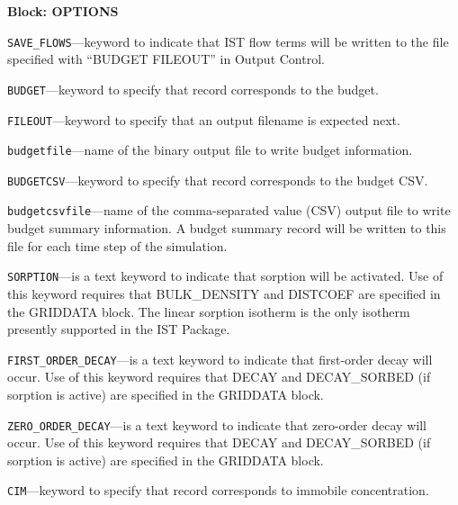 
\item \textbf{Block: OPTIONS}

\begin{description}
\item \texttt{SAVE\_FLOWS}---keyword to indicate that IST flow terms will be written to the file specified with ``BUDGET FILEOUT'' in Output Control.

\item \texttt{BUDGET}---keyword to specify that record corresponds to the budget.

\item \texttt{FILEOUT}---keyword to specify that an output filename is expected next.

\item \texttt{budgetfile}---name of the binary output file to write budget information.

\item \texttt{BUDGETCSV}---keyword to specify that record corresponds to the budget CSV.

\item \texttt{budgetcsvfile}---name of the comma-separated value (CSV) output file to write budget summary information.  A budget summary record will be written to this file for each time step of the simulation.

\item \texttt{SORPTION}---is a text keyword to indicate that sorption will be activated.  Use of this keyword requires that BULK\_DENSITY and DISTCOEF are specified in the GRIDDATA block.  The linear sorption isotherm is the only isotherm presently supported in the IST Package.

\item \texttt{FIRST\_ORDER\_DECAY}---is a text keyword to indicate that first-order decay will occur.  Use of this keyword requires that DECAY and DECAY\_SORBED (if sorption is active) are specified in the GRIDDATA block.

\item \texttt{ZERO\_ORDER\_DECAY}---is a text keyword to indicate that zero-order decay will occur.  Use of this keyword requires that DECAY and DECAY\_SORBED (if sorption is active) are specified in the GRIDDATA block.

\item \texttt{CIM}---keyword to specify that record corresponds to immobile concentration.


\end{description}

